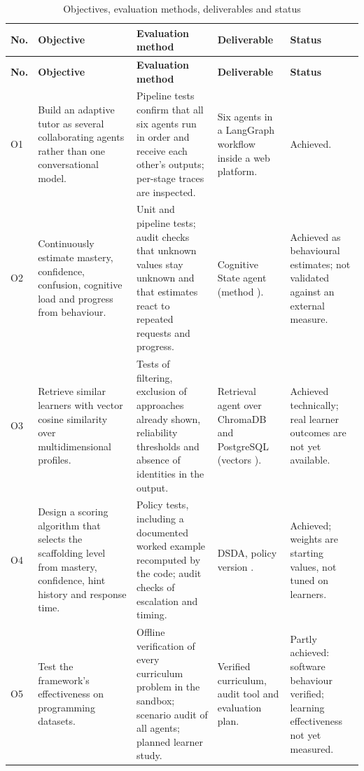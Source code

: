 \begingroup\small
\setlength{\tabcolsep}{4pt}\renewcommand{\arraystretch}{1.2}
\begin{longtable}{|R{0.5cm}|R{3.5cm}|R{4.2cm}|R{3.0cm}|R{2.4cm}|}
\caption{Objectives, evaluation methods, deliverables and status}\label{tab:objectives}\\\hline
\textbf{No.} & \textbf{Objective} & \textbf{Evaluation method} & \textbf{Deliverable} & \textbf{Status}\\\hline\endfirsthead
\hline\textbf{No.} & \textbf{Objective} & \textbf{Evaluation method} & \textbf{Deliverable} & \textbf{Status}\\\hline\endhead
O1 & Build an adaptive tutor as several collaborating agents rather than one conversational model. & Pipeline tests confirm that all six agents run in order and receive each other's outputs; per-stage traces are inspected. & Six agents in a LangGraph workflow inside a web platform. & Achieved.\\\hline
O2 & Continuously estimate mastery, confidence, confusion, cognitive load and progress from behaviour. & Unit and pipeline tests; audit checks that unknown values stay unknown and that estimates react to repeated requests and progress. & Cognitive State agent (method ). & Achieved as behavioural estimates; not validated against an external measure.\\\hline
O3 & Retrieve similar learners with vector cosine similarity over multidimensional profiles. & Tests of filtering, exclusion of approaches already shown, reliability thresholds and absence of identities in the output. & Retrieval agent over ChromaDB and PostgreSQL (vectors ). & Achieved technically; real learner outcomes are not yet available.\\\hline
O4 & Design a scoring algorithm that selects the scaffolding level from mastery, confidence, hint history and response time. & Policy tests, including a documented worked example recomputed by the code; audit checks of escalation and timing. & DSDA, policy version . & Achieved; weights are starting values, not tuned on learners.\\\hline
O5 & Test the framework's effectiveness on programming datasets. & Offline verification of every curriculum problem in the sandbox; scenario audit of all agents; planned learner study. & Verified curriculum, audit tool and evaluation plan. & Partly achieved: software behaviour verified; learning effectiveness not yet measured.\\\hline
\end{longtable}
\endgroup

